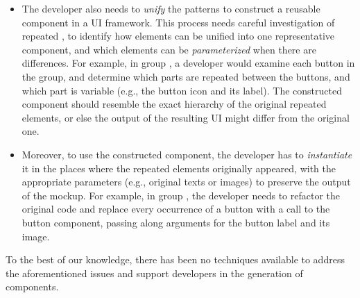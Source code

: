 \begin{itemize}[leftmargin=*]
\begin{enumerate}[leftmargin=*]
	\end{enumerate}
		
	\item The developer also needs to \textit{unify} the patterns
	to construct a reusable component in a UI framework.
	This process needs careful investigation of repeated \html,
	to identify how elements can be unified into one representative component,
	and which elements can be \textit{parameterized} when there are differences.
	For example, in group , a developer would examine each button in the group, and determine which parts are repeated between the buttons, and which part is variable (e.g., the button icon and its label).
	The constructed component should resemble the exact hierarchy of the original repeated elements,
	or else the output of the resulting UI might differ from the original one.
	
	 
	\item Moreover, to use the constructed component,
	the developer has to \textit{instantiate} it
	in the places where the repeated elements originally appeared,
	with the appropriate parameters (e.g., original texts or images)
	to preserve the output of the mockup.
	For example, in group , the developer needs to refactor the original code and replace every occurrence of a button with a call to the button component, passing along arguments for the button label and its image.
\end{itemize}

To the best of our knowledge, there has been no techniques 
available to address the aforementioned issues and 
support developers in the generation of components.







